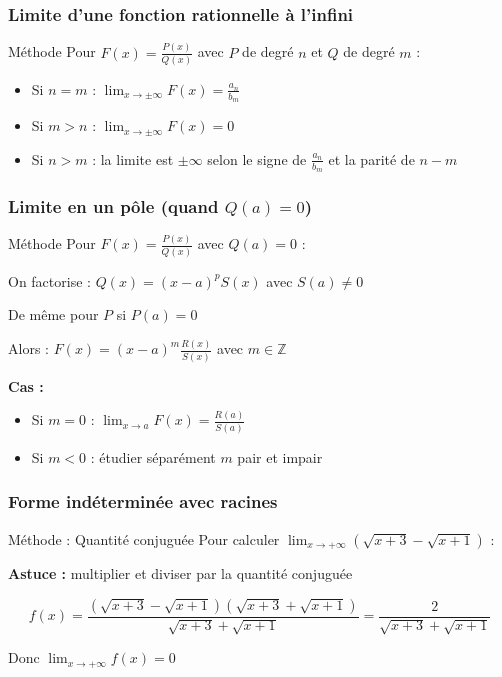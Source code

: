 \documentclass[a4paper,11pt]{article}
\begin{document}
\subsubsection{Limite d'une fonction rationnelle à l'infini}

\begin{methodbox}{Méthode}
Pour $F(x) = \frac{P(x)}{Q(x)}$ avec $P$ de degré $n$ et $Q$ de degré $m$ :

\begin{itemize}
    \item Si $n = m$ : $\lim_{x \to \pm\infty} F(x) = \frac{a_n}{b_m}$
    \item Si $m > n$ : $\lim_{x \to \pm\infty} F(x) = 0$
    \item Si $n > m$ : la limite est $\pm\infty$ selon le signe de $\frac{a_n}{b_m}$ et la parité de $n - m$
\end{itemize}
\end{methodbox}

\subsubsection{Limite en un pôle (quand $Q(a) = 0$)}

\begin{methodbox}{Méthode}
Pour $F(x) = \frac{P(x)}{Q(x)}$ avec $Q(a) = 0$ :

On factorise : $Q(x) = (x - a)^p S(x)$ avec $S(a) \neq 0$

De même pour $P$ si $P(a) = 0$

Alors : $F(x) = (x - a)^m \frac{R(x)}{S(x)}$ avec $m \in \mathbb{Z}$

\textbf{Cas :}
\begin{itemize}
    \item Si $m = 0$ : $\lim_{x \to a} F(x) = \frac{R(a)}{S(a)}$
    \item Si $m < 0$ : étudier séparément $m$ pair et impair
\end{itemize}
\end{methodbox}

\subsubsection{Forme indéterminée avec racines}

\begin{methodbox}{Méthode : Quantité conjuguée}
Pour calculer $\lim_{x \to +\infty} (\sqrt{x + 3} - \sqrt{x + 1})$ :

\textbf{Astuce :} multiplier et diviser par la quantité conjuguée

\[f(x) = \frac{(\sqrt{x + 3} - \sqrt{x + 1})(\sqrt{x + 3} + \sqrt{x + 1})}{\sqrt{x + 3} + \sqrt{x + 1}} = \frac{2}{\sqrt{x + 3} + \sqrt{x + 1}}\]

Donc $\lim_{x \to +\infty} f(x) = 0$
\end{methodbox}
\end{document}

